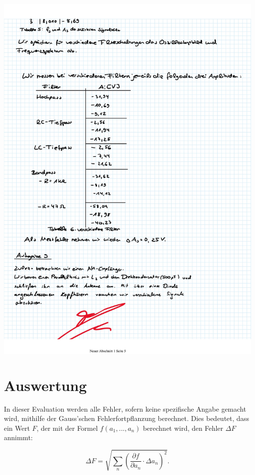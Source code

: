 \documentclass{article}
\begin{document}
\includegraphics[width=\textwidth]{graphics/mess5.jpg}
\newpage

\addtocounter{table}{6}




\clearpage
\newpage
\section{Auswertung}

In dieser Evaluation werden alle Fehler, sofern keine spezifische Angabe gemacht wird, mithilfe der Gauss'schen Fehlerfortpflanzung berechnet. Dies bedeutet, dass ein Wert $F$, der mit der Formel $f(a_1, ..., a_n)$ berechnet wird, den Fehler $\Delta F$ annimmt:

\begin{equation}
    \Delta F = \sqrt{\sum_n \left( \frac{\partial f}{\partial a_n} \cdot \Delta a_n \right)^2}.
\end{equation}
\end{document}
